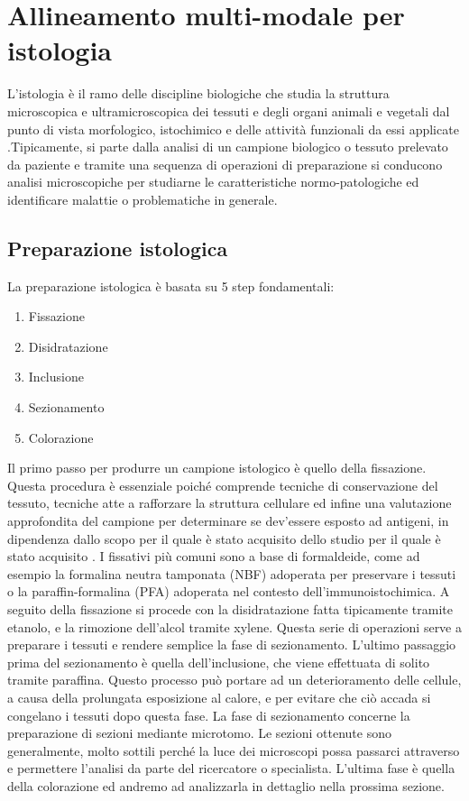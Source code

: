 \chapter{Allineamento multi-modale per istologia}
\frenchspacing
\label{chap:histology}
L'istologia è il ramo delle discipline biologiche che studia la struttura microscopica e ultramicroscopica dei tessuti e degli organi animali e vegetali dal punto di vista morfologico, istochimico e delle attività funzionali da essi applicate \cite{Istologia}.Tipicamente, si parte dalla analisi di un campione biologico o tessuto prelevato da paziente e tramite una sequenza di operazioni di preparazione si conducono analisi microscopiche per studiarne le caratteristiche normo-patologiche ed identificare malattie o problematiche in generale.
\section{Preparazione istologica}
La preparazione istologica è basata su 5 step fondamentali:
\begin{enumerate}
    \item Fissazione
    \item Disidratazione
    \item Inclusione
    \item Sezionamento
    \item Colorazione
\end{enumerate} \hfill \break
\noindent Il primo passo per produrre un campione istologico è quello della fissazione. Questa procedura è essenziale poiché comprende tecniche di conservazione del tessuto, tecniche atte a rafforzare la struttura cellulare ed infine una valutazione approfondita del campione per determinare se dev'essere esposto ad antigeni, in dipendenza dallo scopo per il quale è stato acquisito dello studio per il quale è stato acquisito \cite{Alturkistani2015-bz}. \hfill \break
\noindent I fissativi più comuni sono a base di formaldeide, come ad esempio la formalina neutra tamponata (NBF) adoperata per preservare i tessuti o la paraffin-formalina (PFA) adoperata nel contesto dell'immunoistochimica.
A seguito della fissazione si procede con la disidratazione fatta tipicamente tramite etanolo, e la rimozione dell'alcol tramite xylene. Questa serie di operazioni serve a preparare i tessuti e rendere semplice la fase di sezionamento. \hfill \break
\noindent L'ultimo passaggio prima del sezionamento è quella dell'inclusione, che viene effettuata di solito tramite paraffina. Questo processo può portare ad un deterioramento delle cellule, a causa della prolungata esposizione al calore, e per evitare che ciò accada si congelano i tessuti dopo questa fase. \hfill \break
\noindent La fase di sezionamento concerne la preparazione di sezioni mediante microtomo. Le sezioni ottenute sono generalmente, molto sottili perché la luce dei microscopi possa passarci attraverso e permettere l'analisi da parte del ricercatore o specialista.
L'ultima fase è quella della colorazione ed andremo ad analizzarla in dettaglio nella prossima sezione.
